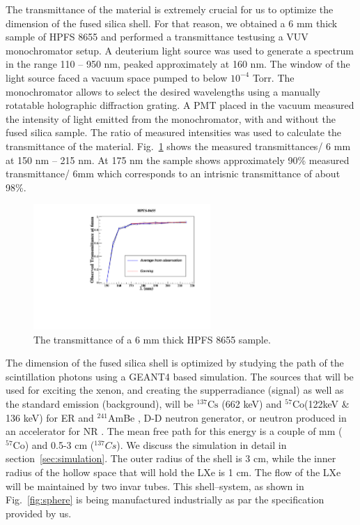 The transmittance of the material is extremely crucial for us to optimize the dimension of the fused silica shell. For that 
reason, we obtained a 6 mm thick sample of HPFS 8655 and performed a transmittance testusing a VUV monochromator setup. 
A deuterium light source was used to generate a spectrum in
the range 110 -- 950 nm, peaked approximately at 160 nm. The window of the light source faced a vacuum
space pumped to below $10^{-4}$ Torr. The monochromator allows to select
the desired wavelengths using a manually rotatable holographic diffraction grating. A PMT placed
in the vacuum measured the intensity of light emitted from the monochromator, with and without
the fused silica sample. The ratio of measured intensities was used to calculate the transmittance
of the material. Fig.~\ref{fig:transmittance} shows the measured transmittances/ 6 mm at 
150 nm -- 215 nm. At 175 nm the sample shows approximately 90\% measured transmittance/ 6mm which corresponds 
to an intrisnic transmittance of about 98\%.  

\begin{figure}
   \centering
   \includegraphics[width=0.6\textwidth]{ObservedTransmittance1.pdf}
   \caption{The transmittance of a 6 mm thick HPFS 8655 sample.} 
   \label{fig:transmittance}
\end{figure}

The dimension of the fused silica shell is optimized by studying the path of the scintillation photons 
using a GEANT4 based simulation. 
The sources that will be used for exciting the xenon, and creating the supperradiance (signal) as well as the standard emission (background), 
will be $^{137} \mathrm{Cs}$ (662 keV) and $^{57} \mathrm{Co}$(122keV \& 136 keV) for ER and $^241$AmBe , D-D neutron generator, or neutron 
produced in an accelerator for NR . The mean free path for this energy is a couple of mm ($^{57} \mathrm{Co}$) and 0.5-3 cm ($^{137} Cs$).  
We discuss the simulation in detail in section~\ref{sec:simulation}. 
The outer radius of the shell is 3 cm, while the inner radius of the hollow space that will hold the 
LXe is 1 cm. The flow of the LXe will be maintained by two invar tubes. This shell--system, as shown 
in Fig.~\ref{fig:sphere} is being manufactured industrially as par the specification provided by us.

